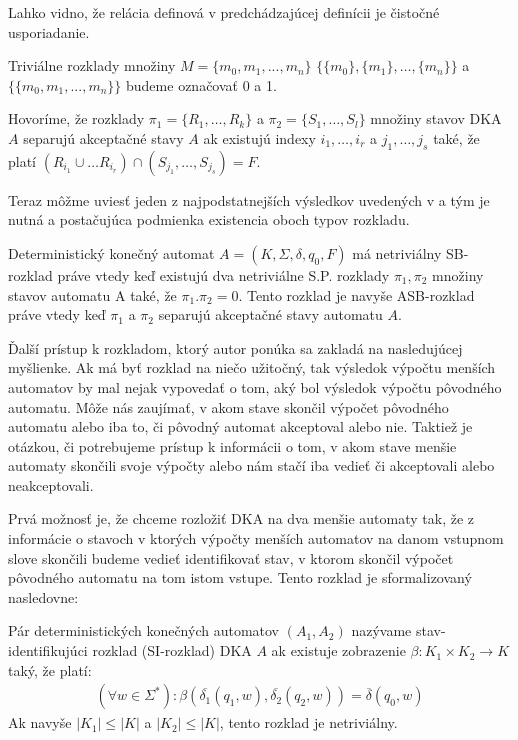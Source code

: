 Lahko vidno, že relácia definová v predchádzajúcej definícii je čistočné usporiadanie.

\begin{notation}
Triviálne rozklady množiny $ M = \lbrace m_0,m_1,...,m_n \rbrace $ $ \lbrace\lbrace m_0 \rbrace, \lbrace m_1 \rbrace, \ldots, \lbrace m_n \rbrace \rbrace $ a $\lbrace \lbrace m_0,m_1,...,m_n \rbrace \rbrace$ budeme označovať 0 a 1.
\end{notation}

\begin{definition}
Hovoríme, že rozklady $ \pi_1 = \lbrace R_1, \ldots , R_k \rbrace $ a $ \pi_2 = \lbrace S_1, \ldots , S_l \rbrace $ množiny stavov DKA $ A $ separujú akceptačné stavy $ A $ ak existujú indexy $ i_1, \ldots, i_r $ a $ j_1, \ldots, j_s $ také, že platí $ (R_{i_1} \cup \ldots R_{i_r}) \cap (S_{j_1}, \ldots, S_{j_s}) = F $.
\end{definition}

Teraz môžme uviesť jeden z najpodstatnejších výsledkov uvedených v \cite{Gazi} a tým je nutná a postačujúca podmienka existencia oboch typov rozkladu.

\begin{theorem}
Deterministický konečný automat $ A = (K, \Sigma, \delta, q_0, F) $ má netriviálny SB-rozklad práve vtedy keď existujú dva netriviálne S.P. rozklady $ \pi_1,\pi_2 $ množiny stavov automatu A také, že $ \pi_1.\pi_2 = 0  $. Tento rozklad je navyše ASB-rozklad práve vtedy keď  $ \pi_1$ a $\pi_2 $ separujú akceptačné stavy automatu $ A $.
\end{theorem}

Ďalší prístup k rozkladom, ktorý autor ponúka sa zakladá na nasledujúcej myšlienke. Ak má byť rozklad na niečo užitočný, tak výsledok výpočtu menších automatov by mal nejak vypovedať o tom, aký bol výsledok výpočtu pôvodného automatu. Môže nás zaujímať, v akom stave skončil výpočet pôvodného automatu alebo iba to, či pôvodný automat akceptoval alebo nie. Taktiež je otázkou, či potrebujeme prístup k informácii o tom, v akom stave menšie automaty skončili svoje výpočty alebo nám stačí iba vedieť či akceptovali alebo neakceptovali.
\par
Prvá možnosť je, že chceme rozložiť DKA na dva menšie automaty tak, že z informácie o stavoch v ktorých výpočty menších automatov na danom vstupnom slove skončili budeme vedieť identifikovať stav, v ktorom skončil výpočet pôvodného automatu na tom istom vstupe. Tento rozklad je sformalizovaný nasledovne:

\begin{definition}
Pár deterministických konečných automatov $ (A_1,A_2) $ nazývame stav-identifikujúci rozklad (SI-rozklad) DKA $ A $ ak existuje zobrazenie $ \beta : K_1 \times K_2 \rightarrow K $ taký, že platí:
\begin{align*}
(\forall w \in \Sigma^*): \beta(\overline{\delta_1}(q_1,w),\overline{\delta_2}(q_2,w)) = \overline{\delta}(q_0,w)
\end{align*}
Ak navyše $ |K_1| \leq |K| $ a $ |K_2| \leq |K| $, tento rozklad je netriviálny.
\end{definition}

